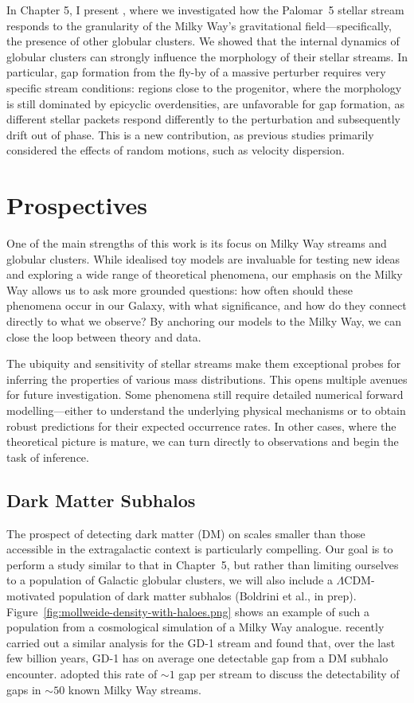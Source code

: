     In Chapter 5, I present \citet{2025A&A...699A.289F}, where we investigated how the Palomar~5 stellar stream responds to the granularity of the Milky Way's gravitational field—specifically, the presence of other globular clusters. We showed that the internal dynamics of globular clusters can strongly influence the morphology of their stellar streams. In particular, gap formation from the fly-by of a massive perturber requires very specific stream conditions: regions close to the progenitor, where the morphology is still dominated by epicyclic overdensities, are unfavorable for gap formation, as different stellar packets respond differently to the perturbation and subsequently drift out of phase. This is a new contribution, as previous studies primarily considered the effects of random motions, such as velocity dispersion.

\section{Prospectives}
    One of the main strengths of this work is its focus on Milky Way streams and globular clusters. While idealised toy models are invaluable for testing new ideas and exploring a wide range of theoretical phenomena, our emphasis on the Milky Way allows us to ask more grounded questions: how often should these phenomena occur in our Galaxy, with what significance, and how do they connect directly to what we observe? By anchoring our models to the Milky Way, we can close the loop between theory and data.

    The ubiquity and sensitivity of stellar streams make them exceptional probes for inferring the properties of various mass distributions. This opens multiple avenues for future investigation. Some phenomena still require detailed numerical forward modelling—either to understand the underlying physical mechanisms or to obtain robust predictions for their expected occurrence rates. In other cases, where the theoretical picture is mature, we can turn directly to observations and begin the task of inference.
    
    \subsection{Dark Matter Subhalos}
        The prospect of detecting dark matter (DM) on scales smaller than those accessible in the extragalactic context is particularly compelling. Our goal is to perform a study similar to that in Chapter~5, but rather than limiting ourselves to a population of Galactic globular clusters, we will also include a $\Lambda$CDM-motivated population of dark matter subhalos (Boldrini et al., in prep). Figure~\ref{fig:mollweide-density-with-haloes.png} shows an example of such a population from a cosmological simulation of a Milky Way analogue. \citet{2024arXiv241213144A} recently carried out a similar analysis for the GD-1 stream and found that, over the last few billion years, GD-1 has on average one detectable gap from a DM subhalo encounter. \citet{2025arXiv250207781L} adopted this rate of $\sim1$ gap per stream to discuss the detectability of gaps in $\sim 50$ known Milky Way streams.

